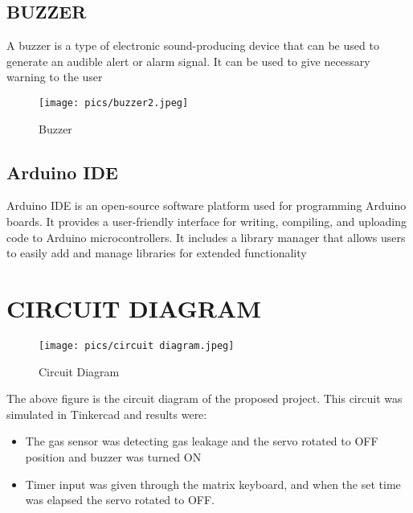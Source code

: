 \documentclass[a4paper,12pt]{report}
\begin{document}
\begin{}
\section{BUZZER} 
\para
A buzzer is a type of electronic sound-producing device that can be used to generate an audible
alert or alarm signal. It can be used to give necessary warning to the user
\begin{center}
    \begin{figure}[!hbt]
    \texttt{[image: pics/buzzer2.jpeg]}
    \centering
    \caption{Buzzer}
    \label{fig:}
    \end{figure}
\end{center}

\section{Arduino IDE}

Arduino IDE is an open-source software platform used for programming Arduino boards. It
provides a user-friendly interface for writing, compiling, and uploading code to Arduino
microcontrollers.
It includes a library manager that allows users to easily add and manage libraries for extended
functionality

\chapter{CIRCUIT DIAGRAM}
\begin{center}
    \begin{figure}[!hbt]
    \texttt{[image: pics/circuit diagram.jpeg]}
    \centering
    \caption{Circuit Diagram}
    \label{fig:}
    \end{figure}
\end{center}
 
The above figure is the circuit diagram of the proposed project. This circuit was simulated in
Tinkercad and results were:
\begin{itemize}
    \item The gas sensor was detecting gas leakage and the servo rotated to OFF position and
    buzzer was turned ON
    \item Timer input was given through the matrix keyboard, and when the set time was elapsed
    the servo rotated to OFF.
\end{itemize}
\newpage
 
{
\begin{table}

\end{table}}
\end{}
\end{document}
